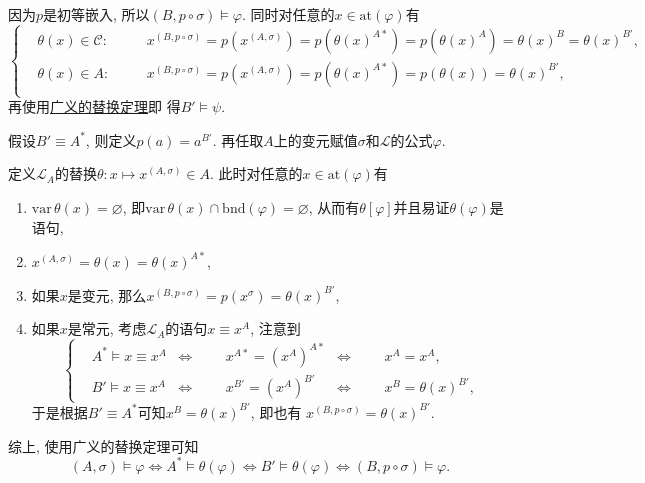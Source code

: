 \documentclass[UTF8]{ctexart}
\begin{document}
因为$p$是初等嵌入, 所以$(B,p\circ\sigma)\models\varphi$.
同时对任意的$x\in\mathrm{at}(\varphi)$有
\[\left\{\begin{aligned}
    &\theta(x)\in\mathcal{C}:\quad
    &&x^{(B,p\circ\sigma)}=p(x^{(A,\sigma)})=p(\theta(x)^{A*})=
    p(\theta(x)^A)=\theta(x)^B=\theta(x)^{B'},\\[-3pt]
    &\theta(x)\in A:\quad
    &&x^{(B,p\circ\sigma)}=p(x^{(A,\sigma)})=p(\theta(x)^{A*})=
    p(\theta(x))=\theta(x)^{B'},\\[3pt]
\end{aligned}\right.\]
再使用\href{../02 一阶语义/04 替换定理#nameddest=sec:定理2.1}{广义的替换定理}即
得$B'\models\psi$.


假设$B'\equiv A^*$, 则定义$p(a)=a^{B'}$.
再任取$A$上的变元赋值$\sigma$和$\mathcal{L}$的公式$\varphi$.

定义$\mathcal{L}_A$的替换$\theta:x\mapsto x^{(A,\sigma)}\in A$.
此时对任意的$x\in\mathrm{at}(\varphi)$有
\begin{enumerate}
    \item $\mathrm{var}\,\theta(x)=\varnothing$, 即$
    \mathrm{var}\,\theta(x)\cap\mathrm{bnd}(\varphi)=\varnothing$,
    从而有$\theta[\varphi]$并且易证$\theta(\varphi)$是语句,
    \item $x^{(A,\sigma)}=\theta(x)=\theta(x)^{A*}$,
    \item 如果$x$是变元, 那么$x^{(B,p\circ\sigma)}=p(x^\sigma)=\theta(x)^{B'}$,
    \item 如果$x$是常元, 考虑$\mathcal{L}_A$的语句$x\equiv x^A$, 注意到
    \[\left\{\begin{aligned}
        &A^*\models x\equiv x^A&\iff&&&x^{A*}=(x^A)^{A*}&\iff&&&x^A=x^A,\\[-3pt]
        &B'\models x\equiv x^A&\iff&&&x^{B'}=(x^A)^{B'}&\iff&&&x^B=\theta(x)^{B'},
    \end{aligned}\right.\]
    于是根据$B'\equiv A^*$可知$x^B=\theta(x)^{B'}$, 即也有
    $x^{(B,p\circ\sigma)}=\theta(x)^{B'}$.
\end{enumerate}

综上, 使用广义的替换定理可知
\begin{equation*}
    (A,\sigma)\models\varphi\iff A^*\models\theta(\varphi)\iff
    B'\models\theta(\varphi)\iff(B,p\circ\sigma)\models\varphi.
\tag*{\qedsymbol}\end{equation*}
\end{document}
